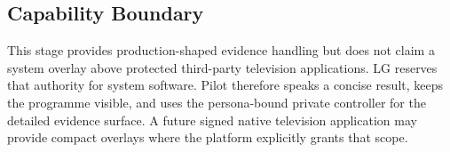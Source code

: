\subsection{Capability Boundary}

This stage provides production-shaped evidence handling but does not claim a
system overlay above protected third-party television applications.  LG reserves
that authority for system software.  Pilot therefore speaks a concise result,
keeps the programme visible, and uses the persona-bound private controller for
the detailed evidence surface.  A future signed native television application
may provide compact overlays where the platform explicitly grants that scope.
